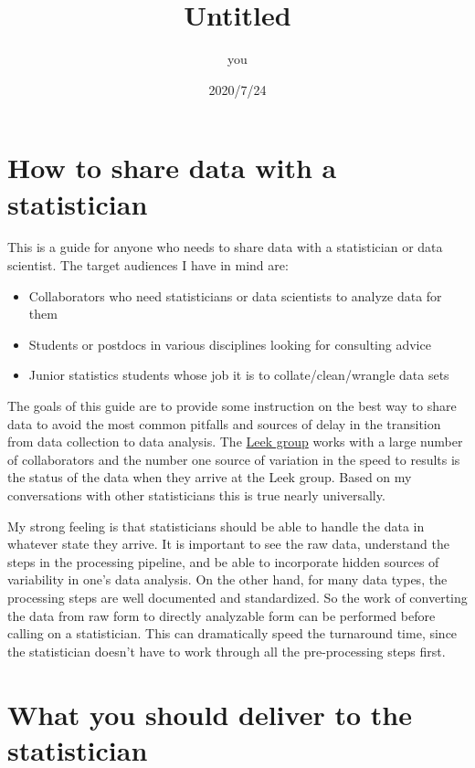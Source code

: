 \documentclass[
]{article}
\title{Untitled}
\author{you}
\date{2020/7/24}
\providecommand{\tightlist}{%
  \setlength{\itemsep}{0pt}\setlength{\parskip}{0pt}}
\begin{document}
\maketitle

\hypertarget{how-to-share-data-with-a-statistician}{%
\section{How to share data with a
statistician}\label{how-to-share-data-with-a-statistician}}

This is a guide for anyone who needs to share data with a statistician
or data scientist. The target audiences I have in mind are:

\begin{itemize}
\tightlist
\item
  Collaborators who need statisticians or data scientists to analyze
  data for them
\item
  Students or postdocs in various disciplines looking for consulting
  advice
\item
  Junior statistics students whose job it is to collate/clean/wrangle
  data sets
\end{itemize}

The goals of this guide are to provide some instruction on the best way
to share data to avoid the most common pitfalls and sources of delay in
the transition from data collection to data analysis. The
\href{http://biostat.jhsph.edu/~jleek/}{Leek group} works with a large
number of collaborators and the number one source of variation in the
speed to results is the status of the data when they arrive at the Leek
group. Based on my conversations with other statisticians this is true
nearly universally.

My strong feeling is that statisticians should be able to handle the
data in whatever state they arrive. It is important to see the raw data,
understand the steps in the processing pipeline, and be able to
incorporate hidden sources of variability in one's data analysis. On the
other hand, for many data types, the processing steps are well
documented and standardized. So the work of converting the data from raw
form to directly analyzable form can be performed before calling on a
statistician. This can dramatically speed the turnaround time, since the
statistician doesn't have to work through all the pre-processing steps
first.

\hypertarget{what-you-should-deliver-to-the-statistician}{%
\section{What you should deliver to the
statistician}\label{what-you-should-deliver-to-the-statistician}}
\end{document}

